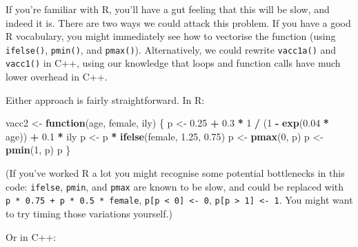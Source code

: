 \documentclass[]{book}
\newenvironment{Shaded}{\begin{snugshade}}{\end{snugshade}}
\newcommand{\ControlFlowTok}[1]{\textcolor[rgb]{0.27,0.27,0.27}{\textbf{#1}}}
\newcommand{\DecValTok}[1]{\textcolor[rgb]{0.06,0.06,0.06}{#1}}
\newcommand{\FloatTok}[1]{\textcolor[rgb]{0.06,0.06,0.06}{#1}}
\newcommand{\KeywordTok}[1]{\textcolor[rgb]{0.27,0.27,0.27}{\textbf{#1}}}
\newcommand{\NormalTok}[1]{#1}
\newcommand{\OperatorTok}[1]{\textcolor[rgb]{0.43,0.43,0.43}{\textbf{#1}}}
\newcommand{\StringTok}[1]{\textcolor[rgb]{0.5,0.5,0.5}{#1}}
\begin{document}
If you're familiar with R, you'll have a gut feeling that this will be slow, and indeed it is. There are two ways we could attack this problem. If you have a good R vocabulary, you might immediately see how to vectorise the function (using \texttt{ifelse()}, \texttt{pmin()}, and \texttt{pmax()}). Alternatively, we could rewrite \texttt{vacc1a()} and \texttt{vacc1()} in C++, using our knowledge that loops and function calls have much lower overhead in C++.

Either approach is fairly straightforward. In R:

\begin{Shaded}
\begin{Highlighting}[]
\NormalTok{vacc2 <-}\StringTok{ }\ControlFlowTok{function}\NormalTok{(age, female, ily) \{}
\NormalTok{  p <-}\StringTok{ }\FloatTok{0.25} \OperatorTok{+}\StringTok{ }\FloatTok{0.3} \OperatorTok{*}\StringTok{ }\DecValTok{1} \OperatorTok{/}\StringTok{ }\NormalTok{(}\DecValTok{1} \OperatorTok{-}\StringTok{ }\KeywordTok{exp}\NormalTok{(}\FloatTok{0.04} \OperatorTok{*}\StringTok{ }\NormalTok{age)) }\OperatorTok{+}\StringTok{ }\FloatTok{0.1} \OperatorTok{*}\StringTok{ }\NormalTok{ily}
\NormalTok{  p <-}\StringTok{ }\NormalTok{p }\OperatorTok{*}\StringTok{ }\KeywordTok{ifelse}\NormalTok{(female, }\FloatTok{1.25}\NormalTok{, }\FloatTok{0.75}\NormalTok{)}
\NormalTok{  p <-}\StringTok{ }\KeywordTok{pmax}\NormalTok{(}\DecValTok{0}\NormalTok{, p)}
\NormalTok{  p <-}\StringTok{ }\KeywordTok{pmin}\NormalTok{(}\DecValTok{1}\NormalTok{, p)}
\NormalTok{  p}
\NormalTok{\}}
\end{Highlighting}
\end{Shaded}

(If you've worked R a lot you might recognise some potential bottlenecks in this code: \texttt{ifelse}, \texttt{pmin}, and \texttt{pmax} are known to be slow, and could be replaced with \texttt{p\ *\ 0.75\ +\ p\ *\ 0.5\ *\ female}, \texttt{p{[}p\ \textless{}\ 0{]}\ \textless{}-\ 0}, \texttt{p{[}p\ \textgreater{}\ 1{]}\ \textless{}-\ 1}. You might want to try timing those variations yourself.)

Or in C++:
\end{document}
